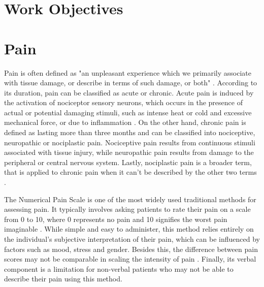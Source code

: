 \section{Work Objectives}









\section{Pain}

Pain is often defined as "an unpleasant experience which we primarily 
associate with tissue damage, or describe in terms
of such damage, or both" \cite{Fang2025}. According to its duration, pain can be classified as acute or chronic. Acute pain is induced by the activation of nociceptor sensory neurons, which occurs in the presence of actual or potential damaging stimuli, such as intense heat or cold and excessive mechanical force, or due to inflammation \cite{Jayakar2021}. On the other hand, chronic pain is defined as lasting more than three months \cite{Raman2022} and can be classified into nociceptive, neuropathic or nociplastic pain. Nociceptive pain results from continuous stimuli associated with tissue injury, while neuropathic pain results from damage to the peripheral or central nervous system. Lastly, nociplastic pain is a broader term, that is applied to chronic pain when it can't be described by the other two terms \cite{Fitzcharles2021}.

The Numerical Pain Scale is one of the most widely used traditional methods for assessing pain. It typically involves asking patients to rate their pain on a scale from 0 to 10, where 0 represents no pain and 10 signifies the worst pain imaginable \cite{Nugent2021}. While simple and easy to administer, this method relies entirely on the individual’s subjective interpretation of their pain, which can be influenced by factors such as mood, stress and gender. Besides this, the difference between pain scores may not be comparable in scaling the intensity of pain \cite{Adeboye2021}. Finally, its verbal component is a limitation for non-verbal patients who may not be able to describe their pain using this method.

